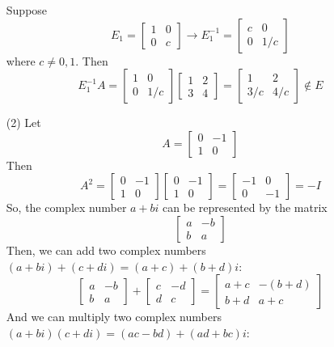 \begin{itemize}
Suppose
$$E_1 = \begin{bmatrix}
1 & 0 \\
0 & c
\end{bmatrix} \rightarrow E_1^{-1} = \begin{bmatrix}
c & 0 \\
0 & 1/c
\end{bmatrix}$$
where $c \neq 0, 1$. Then
$$E_1^{-1}A = \begin{bmatrix}
1 & 0 \\
0 & 1/c
\end{bmatrix}\begin{bmatrix}
1 & 2 \\
3 & 4
\end{bmatrix} = \begin{bmatrix}
1 & 2 \\
3/c & 4/c
\end{bmatrix} \not \in E$$
\item[(2)]
Let
$$A = \begin{bmatrix}
0 & -1 \\
1 & 0
\end{bmatrix}$$
Then
$$A^2 = \begin{bmatrix}
0 & -1 \\
1 & 0
\end{bmatrix}\begin{bmatrix}
0 & -1 \\
1 & 0
\end{bmatrix} = \begin{bmatrix}
-1 & 0 \\
0 & -1
\end{bmatrix} = -I$$
So, the complex number $a + bi$ can be represented by the matrix
$$\begin{bmatrix}
a & -b \\
b & a
\end{bmatrix}$$
Then, we can add two complex numbers $(a + bi) + (c + di) = (a + c) + (b + d)i$:
$$\begin{bmatrix}
a & -b \\
b & a
\end{bmatrix} + \begin{bmatrix}
c & -d \\
d & c
\end{bmatrix} = \begin{bmatrix}
a + c & -(b + d) \\
b + d & a + c
\end{bmatrix}$$
And we can multiply two complex numbers $(a + bi)(c + di) = (ac - bd) + (ad + bc)i$:

\end{itemize}
